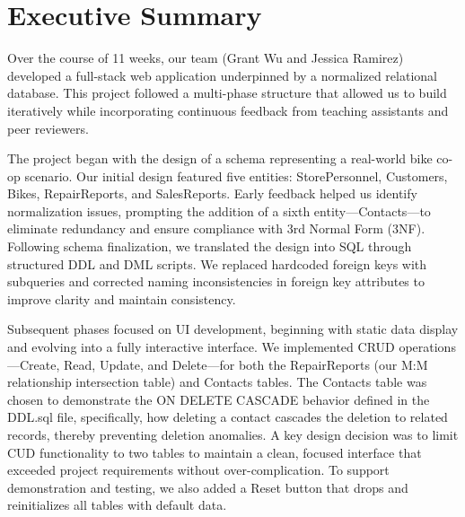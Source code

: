 \documentclass{article}
\begin{document}
\section{Executive Summary}
\begin{tcolorbox}[colback=secondarycolor, colframe=primarycolor, title=\textbf{Reflection on Major Changes Throughout Project}]

Over the course of 11 weeks, our team (Grant Wu and Jessica Ramirez) developed a full-stack web application underpinned by a normalized relational database. This project followed a multi-phase structure that allowed us to build iteratively while incorporating continuous feedback from teaching assistants and peer reviewers.

\vspace{0.2cm}

The project began with the design of a schema representing a real-world bike co-op scenario. Our initial design featured five entities: StorePersonnel, Customers, Bikes, RepairReports, and SalesReports. Early feedback helped us identify normalization issues, prompting the addition of a sixth entity—Contacts—to eliminate redundancy and ensure compliance with 3rd Normal Form (3NF). Following schema finalization, we translated the design into SQL through structured DDL and DML scripts. We replaced hardcoded foreign keys with subqueries and corrected naming inconsistencies in foreign key attributes to improve clarity and maintain consistency.

\vspace{0.2cm}

Subsequent phases focused on UI development, beginning with static data display and evolving into a fully interactive interface. We implemented CRUD operations—Create, Read, Update, and Delete—for both the RepairReports (our M:M relationship intersection table) and Contacts tables. The Contacts table was chosen to demonstrate the ON DELETE CASCADE behavior defined in the DDL.sql file, specifically, how deleting a contact cascades the deletion to related records, thereby preventing deletion anomalies. A key design decision was to limit CUD functionality to two tables to maintain a clean, focused interface that exceeded project requirements without over-complication. To support demonstration and testing, we also added a Reset button that drops and reinitializes all tables with default data.

\vspace{0.2cm}


\end{tcolorbox}
\end{document}

